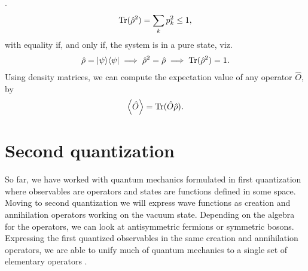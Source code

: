         \cite{modern-qm}.
        \begin{align}
            \operatorname{Tr}(\hat{\rho}^2) = \sum_{k} p_k^2 \leq 1,
        \end{align}
        with equality if, and only if, the system is in a pure state, viz.
        \begin{align}
            \hat{\rho} = | \psi \rangle\langle \psi |
            \implies \hat{\rho}^2 = \hat{\rho}
            \implies \operatorname{Tr}(\hat{\rho}^2) = 1.
        \end{align}
        Using density matrices, we can compute the expectation value of any
        operator $\hat{O}$, by \cite{modern-qm}
        \begin{align}
            \left\langle \hat{O} \right\rangle = \operatorname{Tr}(\hat{O}\hat{\rho}).
        \end{align}

    \section{Second quantization}
        So far, we have worked with quantum mechanics formulated in first
        quantization where observables are operators and states are functions
        defined in some space.
        Moving to second quantization we will express wave functions as creation
        and annihilation operators working on the vacuum state.
        Depending on the algebra for the operators, we can look at antisymmetric
        fermions or symmetric bosons.
        Expressing the first quantized observables in the same creation and
        annihilation operators, we are able to unify much of quantum mechanics
        to a single set of elementary operators \cite{helgaker-molecular}.

